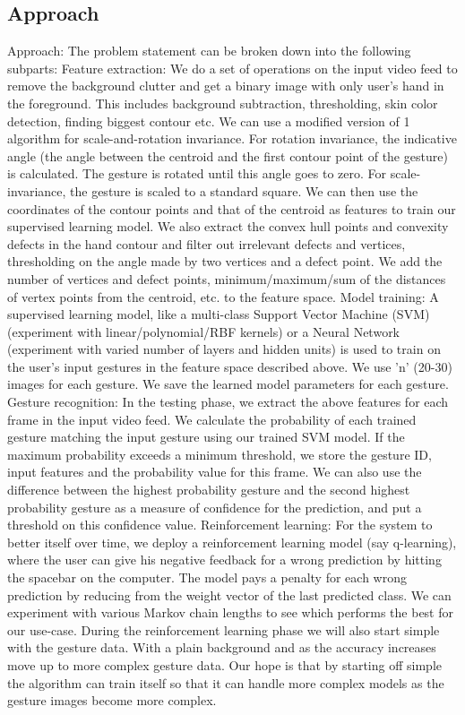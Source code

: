 \documentclass{article}
\begin{document}
\subsection{Approach}
Approach: The problem statement can be broken down into the following subparts:
Feature extraction: We do a set of operations on the input video feed to remove the background clutter and get a binary image with only user's hand in the foreground. This includes background subtraction, thresholding, skin color detection, finding biggest contour etc. We can use a modified version of 1 algorithm for scale-and-rotation invariance. For rotation invariance, the indicative angle (the angle between the centroid and the first contour point of the gesture) is calculated. The gesture is rotated until this angle goes to zero. For scale-invariance, the gesture is scaled to a standard square. We can then use the coordinates of the contour points and that of the centroid as features to train our supervised learning model. We also extract the convex hull points and convexity defects in the hand contour and filter out irrelevant defects and vertices, thresholding on the angle made by two vertices and a defect point. We add the number of vertices and defect points, minimum/maximum/sum of the distances of vertex points from the centroid, etc. to the feature space.
Model training: A supervised learning model, like a multi-class Support Vector Machine (SVM) (experiment with linear/polynomial/RBF kernels) or a Neural Network (experiment with varied number of layers and hidden units) is used to train on the user's input gestures in the feature space described above. We use 'n' (20-30) images for each gesture. We save the learned model parameters for each gesture.
Gesture recognition: In the testing phase, we extract the above features for each frame in the input video feed. We calculate the probability of each trained gesture matching the input gesture using our trained SVM model. If the maximum probability exceeds a minimum threshold, we store the gesture ID, input features and the probability value for this frame. We can also use the difference between the highest probability gesture and the second highest probability gesture as a measure of confidence for the prediction, and put a threshold on this confidence value.
Reinforcement learning: For the system to better itself over time, we deploy a reinforcement learning model (say q-learning), where the user can give his negative feedback for a wrong prediction by hitting the spacebar on the computer. The model pays a penalty for each wrong prediction by reducing from the weight vector of the last predicted class. We can experiment with various Markov chain lengths to see which performs the best for our use-case. During the reinforcement learning phase we will also start simple with the gesture data. With a plain background and as the accuracy increases move up to more complex gesture data. Our hope is that by starting off simple the algorithm can train itself  so that it can handle more complex models as the gesture images become more complex.
\end{document}
